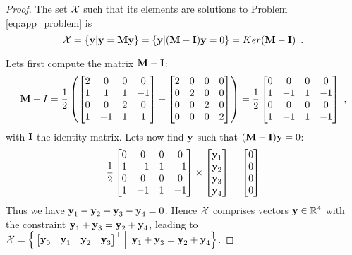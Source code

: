 \begin{proof}
	The set $\mathcal{X}$ such that its elements are solutions to Problem \ref{eq:app_problem} is
	$$
	\setX = \{\vy | \vy = \mm\vy\} = \{\vy | (\mm - \mi)\vy = 0\}  = Ker(\mm - \mi)\enspace.
	$$
	
	Lets first compute the matrix $\mm-\mi$:
	\begin{equation*}
		\begin{split}
			\mm - I = \frac{1}{2} \left( 
			\begin{bmatrix}
				2 & 0 & 0 & 0 \\
				1 & 1 & 1 & -1 \\
				0 & 0 & 2 & 0 \\
				1 & -1 & 1 & 1
			\end{bmatrix} -
			\begin{bmatrix}
				2 & 0 & 0 & 0 \\
				0 & 2 & 0 & 0 \\
				0 & 0 & 2 & 0 \\
				0 & 0 & 0 & 2
			\end{bmatrix}
			\right)
			= \frac{1}{2}\begin{bmatrix}
				0 & 0 & 0 & 0 \\
				1 & -1 & 1 & -1 \\
				0 & 0 & 0 & 0 \\
				1 & -1 & 1 & -1
			\end{bmatrix}
		\end{split} \enspace,
	\end{equation*}
	with $\mi$ the identity matrix. Lets now find $\textbf{y}$ such that $(\mm - \mi)\vy = 0$:
	$$
	\frac{1}{2}\begin{bmatrix}
		0 & 0 & 0 & 0 \\
		1 & -1 & 1 & -1 \\
		0 & 0 & 0 & 0 \\
		1 & -1 & 1 & -1
	\end{bmatrix} 
	\times
	\begin{bmatrix}
		\textbf{y}_1 \\
		\textbf{y}_2 \\
		\textbf{y}_3 \\
		\textbf{y}_4
	\end{bmatrix} = 
	\begin{bmatrix}
		0 \\
		0 \\
		0 \\
		0
	\end{bmatrix}
	$$
	Thus we have $\textbf{y}_1 - \textbf{y}_2 + \textbf{y}_3 - \textbf{y}_4 = 0$. Hence $\mathcal{X}$ comprises vectors $\textbf{y}\in\mathbb{R}^4$ with the constraint $\textbf{y}_1 + \textbf{y}_3 = \textbf{y}_2 + \textbf{y}_4$, leading to $\mathcal{X} = \Big\{\begin{bmatrix}	\textbf{y}_0 & \textbf{y}_1 & \textbf{y}_2 & \textbf{y}_3 \end{bmatrix}^\top \Big|\enspace \textbf{y}_1 + \textbf{y}_3 = \textbf{y}_2 + \textbf{y}_4\Big\}$.
\end{proof}